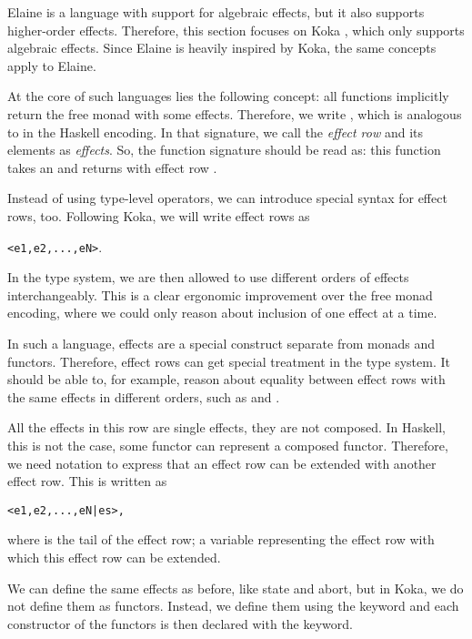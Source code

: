 Elaine is a language with support for algebraic effects, but it also supports higher-order effects. Therefore, this section focuses on Koka \autocite{leijen_koka_2014,leijen_koka_2023}, which only supports algebraic effects. Since Elaine is heavily inspired by Koka, the same concepts apply to Elaine.

At the core of such languages lies the following concept: all functions implicitly return the free monad with some effects. Therefore, we write , which is analogous to  in the Haskell encoding. In that signature, we call  the \emph{effect row} and its elements as \emph{effects}. So, the function signature  should be read as: this function takes an  and returns  with effect row .

Instead of using type-level operators, we can introduce special syntax for effect rows, too. Following Koka, we will write effect rows as
\begin{center}\texttt{<e1,e2,...,eN>}.\end{center}
In the type system, we are then allowed to use different orders of effects interchangeably. This is a clear ergonomic improvement over the free monad encoding, where we could only reason about inclusion of one effect at a time. 

In such a language, effects are a special construct separate from monads and functors. Therefore, effect rows can get special treatment in the type system. It should be able to, for example, reason about equality between effect rows with the same effects in different orders, such as  and .

All the effects in this row are single effects, they are not composed. In Haskell, this is not the case, some functor  can represent a composed functor. Therefore, we need notation to express that an effect row can be extended with another effect row. This is written as
\begin{center}\texttt{<e1,e2,...,eN|es>,}\end{center}
where  is the tail of the effect row; a variable representing the effect row with which this effect row can be extended.

We can define the same effects as before, like state and abort, but in Koka, we do not define them as functors. Instead, we define them using the  keyword and each constructor of the functors is then declared with the  keyword.

